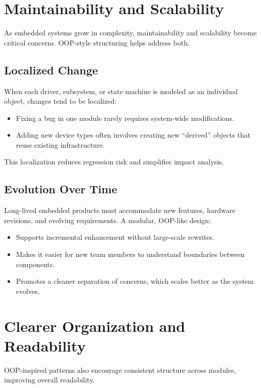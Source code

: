 \documentclass[11pt]{article}
\begin{document}
\section{Maintainability and Scalability}

As embedded systems grow in complexity, maintainability and scalability become critical concerns. OOP-style structuring helps address both.

\subsection{Localized Change}

When each driver, subsystem, or state machine is modeled as an individual object, changes tend to be localized:
\begin{itemize}[nosep]
  \item Fixing a bug in one module rarely requires system-wide modifications.
  \item Adding new device types often involves creating new ``derived'' objects that reuse existing infrastructure.
\end{itemize}

This localization reduces regression risk and simplifies impact analysis.

\subsection{Evolution Over Time}

Long-lived embedded products must accommodate new features, hardware revisions, and evolving requirements. A modular, OOP-like design:
\begin{itemize}[nosep]
  \item Supports incremental enhancement without large-scale rewrites.
  \item Makes it easier for new team members to understand boundaries between components.
  \item Promotes a cleaner separation of concerns, which scales better as the system evolves.
\end{itemize}

\section{Clearer Organization and Readability}

OOP-inspired patterns also encourage consistent structure across modules, improving overall readability.
\end{document}

